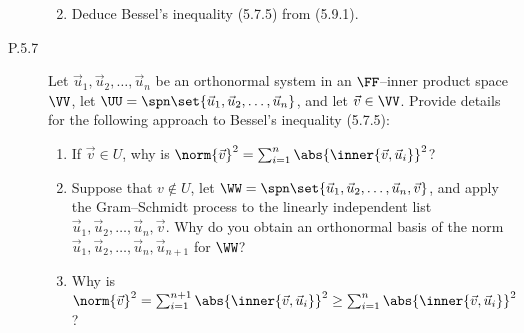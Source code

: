 \documentclass{homework}
\begin{document}
\begin{description}
\begin{enumerate}
    \begin{solution}

    \end{solution}

  \item Deduce Bessel's inequality (5.7.5) from (5.9.1).

    \begin{solution}

    \end{solution}
  \end{enumerate}

\item[P.5.7]
  Let \(\vec u_1, \vec u_2, \dots, \vec u_n\) be an orthonormal system
  in an \(\FF\)--inner product space \(\VV\), let
  \(\UU = \spn\set{\vec u_1, \vec u_2, \dots, \vec u_n}\), and let
  \(\vec v \in \VV\).  Provide details for the following approach to
  Bessel's inequality (5.7.5):
  \begin{enumerate}
  \item If \(\vec v \in U\), why is
    \(\norm{\vec v}^2 = \sum_{i=1}^n \abs{\inner{\vec v, \vec
        u_i}}^2\)?

    \begin{solution}

    \end{solution}

  \item Suppose that \(v \not\in U\), let
    \(\WW = \spn\set{\vec u_1, \vec u_2, \dots, \vec u_n, \vec v}\),
    and apply the Gram--Schmidt process to the linearly independent
    list \(\vec u_1, \vec u_2, \dots, \vec u_n, \vec v\).  Why do you
    obtain an orthonormal basis of the norm
    \(\vec u_1, \vec u_2, \dots, \vec u_n, \vec u_{n+1}\) for \(\WW\)?

    \begin{solution}

    \end{solution}

  \item Why is
    \(\norm{\vec v}^2 = \sum_{i=1}^{n+1} \abs{\inner{\vec v, \vec
        u_i}}^2 \ge \sum_{i=1}^n \abs{\inner{\vec v, \vec u_i}}^2\)?

    \begin{solution}

    \end{solution}
  \end{enumerate}
\end{description}
\end{document}
